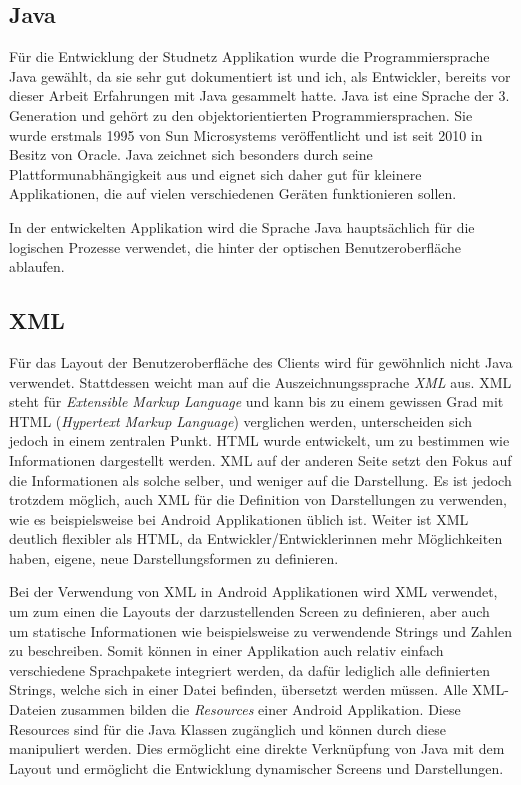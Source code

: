 \documentclass[../main.tex]{subfiles}
\begin{document}
	
	\subsection{Java}
	Für die Entwicklung der Studnetz Applikation wurde die Programmiersprache Java gewählt, da sie sehr gut dokumentiert ist und ich, als Entwickler, bereits vor dieser Arbeit Erfahrungen mit Java gesammelt hatte. Java ist eine Sprache der 3. Generation und gehört zu den objektorientierten Programmiersprachen. Sie wurde erstmals 1995 von Sun Microsystems veröffentlicht und ist seit 2010 in Besitz von Oracle. Java zeichnet sich besonders durch seine Plattformunabhängigkeit aus und eignet sich daher gut für kleinere Applikationen, die auf vielen verschiedenen Geräten funktionieren sollen.
	
	In der entwickelten Applikation wird die Sprache Java hauptsächlich für die logischen Prozesse verwendet, die hinter der optischen Benutzeroberfläche ablaufen.
	
	\subsection{XML}
	Für das Layout der Benutzeroberfläche des Clients wird für gewöhnlich nicht Java verwendet. Stattdessen weicht man auf die Auszeichnungssprache \emph{XML} aus. XML steht für \emph{Extensible Markup Language} und kann bis zu einem gewissen Grad mit HTML (\emph{Hypertext Markup Language}) verglichen werden, unterscheiden sich jedoch in einem zentralen Punkt. HTML wurde entwickelt, um zu bestimmen wie Informationen dargestellt werden. XML auf der anderen Seite setzt den Fokus auf die Informationen als solche selber, und weniger auf die Darstellung. Es ist jedoch trotzdem möglich, auch XML für die Definition von Darstellungen zu verwenden, wie es beispielsweise bei Android Applikationen üblich ist. Weiter ist XML deutlich flexibler als HTML, da Entwickler/Entwicklerinnen mehr Möglichkeiten haben, eigene, neue Darstellungsformen zu definieren.
	
	Bei der Verwendung von XML in Android Applikationen wird XML verwendet, um zum einen die Layouts der darzustellenden Screen zu definieren, aber auch um statische Informationen wie beispielsweise zu verwendende Strings und Zahlen zu beschreiben. Somit können in einer Applikation auch relativ einfach verschiedene Sprachpakete integriert werden, da dafür lediglich alle definierten Strings, welche sich in einer Datei befinden, übersetzt werden müssen. Alle XML-Dateien zusammen bilden die \emph{Resources} einer Android Applikation. Diese Resources sind für die Java Klassen zugänglich und können durch diese manipuliert werden. Dies ermöglicht eine direkte Verknüpfung von Java mit dem Layout und ermöglicht die Entwicklung dynamischer Screens und Darstellungen. \cite{xml} \cite{xmlW3}
	
\end{document}
